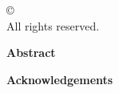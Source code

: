 



\onehalfspacing


\cleardoublepage
\thispagestyle{empty}
\begin{center}
\copyright\ \nombreautor\ \anio \\
All rights reserved.
\end{center}



\cleardoublepage
{} 
\begin{center} \Large \textbf{Abstract} \end{center}
\resumen

\cleardoublepage {}
\begin{center} \Large \textbf{Acknowledgements} \end{center}
\agradecimientos




\cleardoublepage
\tableofcontents
\cleardoublepage
\listoffigures
\cleardoublepage
\listoftables
\cleardoublepage

\normalsize
{}

